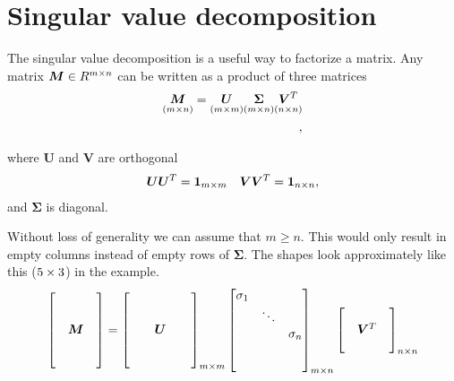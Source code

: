    
\section{Singular value decomposition}
The singular value decomposition is a useful way to factorize a matrix. 
Any matrix $\bm{M} \in R^{m \times n}$ can be written as a product of three matrices
\begin{align}
    \underset{(m \times n)}{\bm{M}}  = \underset{(m \times m)}{\bm{U}}\underset{(m \times n)}{\bm{\Sigma}} \underset{(n \times n)}{\bm{V}^T}\\,
\end{align}

where $\bm{U}$ and $\bm{V}$ are orthogonal 
\begin{align}
    \bm{UU}^T = \bm{1}_{m \times m} && \bm{VV}^T = \bm{1}_{n \times n},
\end{align}
and $\bm{\Sigma}$ is diagonal.

Without loss of generality we can assume that $m \geq n$. This would only result in empty columns instead of empty rows of $\bm{\Sigma}$.
The shapes look approximately like this ($5 \times 3$) in the example.
\begin{align}
    \begin{bmatrix}
    &        & \\
    &        & \\
    & \bm{M} & \\
    &        & \\
    &        & 
    \end{bmatrix}    = 
    \begin{bmatrix}
    & &        & & \\
    & &        & & \\
    & & \bm{U} & & \\
    & &        & & \\
    & &        & & 
    \end{bmatrix}_{m \times m}
    \begin{bmatrix}
    \sigma_1 &        &          \\
                & \ddots &          \\
                &        & \sigma_n \\
                &        &          \\
                &        &          
    \end{bmatrix}_{m \times n}
    \begin{bmatrix}
        &          & \\
        & \bm{V}^T & \\
        &          &  
    \end{bmatrix}_{n \times n}
\end{align}

